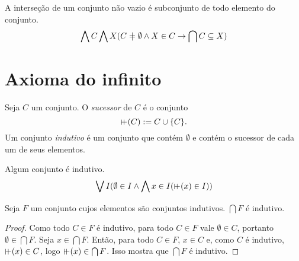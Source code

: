 \begin{proposition}
A interseção de um conjunto não vazio é subconjunto de todo elemento do conjunto.
	\begin{equation*}
	\forall C \forall X(C \neq \emptyset \lee X \in C \limplica \bigcap C \subseteq X)
	\end{equation*}
\end{proposition}

\section{Axioma do infinito}

\begin{definition}
Seja $C$ um conjunto. O \emph{sucessor} de $C$ é o conjunto
	\begin{equation*}
	\suce(C) := C \cup \{C\}.
	\end{equation*}
Um conjunto \emph{indutivo} é um conjunto que contém $\emptyset$ e contém o sucessor de cada um de seus elementos.
\end{definition}

\begin{axiom}
Algum conjunto é indutivo.
	\begin{equation*}
	\exists I(\emptyset \in I \lee \forall x \in I(\suce(x) \in I))
	\end{equation*}
\end{axiom}

\begin{proposition}
Seja $F$ um conjunto cujos elementos são conjuntos indutivos. $\bigcap F$ é indutivo.
\end{proposition}
\begin{proof}
Como todo $C \in F$ é indutivo, para todo $C \in F$ vale $\emptyset \in C$, portanto $\emptyset \in \bigcap F$. Seja $x \in \bigcap F$. Então, para todo $C \in F$, $x \in C$ e, como $C$ é indutivo, $\suce(x) \in C$, logo $\suce(x) \in \bigcap F$. Isso mostra que $\bigcap F$ é indutivo.
\end{proof}

